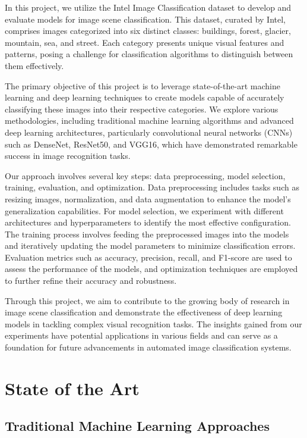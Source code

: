 \documentclass[conference]{IEEEtran}
\begin{document}
In this project, we utilize the Intel Image Classification dataset to develop and evaluate models for image scene classification. This dataset, curated by Intel, comprises images categorized into six distinct classes: buildings, forest, glacier, mountain, sea, and street. Each category presents unique visual features and patterns, posing a challenge for classification algorithms to distinguish between them effectively.

The primary objective of this project is to leverage state-of-the-art machine learning and deep learning techniques to create models capable of accurately classifying these images into their respective categories. We explore various methodologies, including traditional machine learning algorithms and advanced deep learning architectures, particularly convolutional neural networks (CNNs) such as DenseNet, ResNet50, and VGG16, which have demonstrated remarkable success in image recognition tasks.

Our approach involves several key steps: data preprocessing, model selection, training, evaluation, and optimization. Data preprocessing includes tasks such as resizing images, normalization, and data augmentation to enhance the model's generalization capabilities. For model selection, we experiment with different architectures and hyperparameters to identify the most effective configuration. The training process involves feeding the preprocessed images into the models and iteratively updating the model parameters to minimize classification errors. Evaluation metrics such as accuracy, precision, recall, and F1-score are used to assess the performance of the models, and optimization techniques are employed to further refine their accuracy and robustness.

Through this project, we aim to contribute to the growing body of research in image scene classification and demonstrate the effectiveness of deep learning models in tackling complex visual recognition tasks. The insights gained from our experiments have potential applications in various fields and can serve as a foundation for future advancements in automated image classification systems.

\section{State of the Art}

\subsection{Traditional Machine Learning Approaches}
\end{document}
